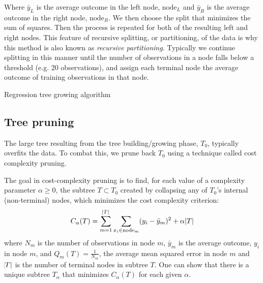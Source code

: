 \documentclass[12pt]{article}
\begin{document}
Where $\bar{y}_{L}$ is the average outcome in the left node, $\text{node}_{L}$ and $\bar{y}_{R}$ is the average outcome in the right node, $\text{node}_{R}$. We then choose the split that minimizes the sum of squares. Then the process is repeated for both of the resulting left and right nodes. This feature of recursive splitting, or partitioning, of the data is why this method is also known as \emph{recursive partitioning}. Typically we continue splitting in this manner until the number of observations in a node falls below a threshold (e.g. 20 observations), and assign each terminal node the average outcome of training observations in that node.

\begin{algorithm}[h]
 \caption{Regression tree growing algorithm}
\end{algorithm}


\subsection{Tree pruning} %
\label{sub:tree_pruning}

The large tree resulting from the tree building/growing phase, $T_{0}$, typically overfits the data. To combat this, we prune back $T_{0}$ using a technique called cost complexity pruning. 

The goal in cost-complexity pruning is to find, for each value of a complexity parameter $\alpha \geq 0$, the subtree $T \subset T_{0}$ created by collapsing any of $T_{0}$'s internal (non-terminal) nodes, which minimizes the cost complexity criterion:
%
\begin{equation}
    C_{\alpha}(T) = \sum_{m = 1}^{\abs{T}} \sum_{x_{i} \in \text{node}_{m}} (y_{i} - \bar{y}_{m})^2 + \alpha \abs{T}
\end{equation}
%
where $N_{m}$ is the number of observations in node $m$, $\bar{y}_{m}$ is the average outcome, $y_{i}$ in node $m$, and $Q_{m}(T) = \frac{1}{N_{m}} $, the average mean squared error in node $m$ and $\abs{T}$ is the number of terminal nodes in subtree $T$. One can show that there is a unique subtree $T_{\alpha}$ that minimizes $C_{\alpha}(T)$ for each given $\alpha$.
\end{document}
